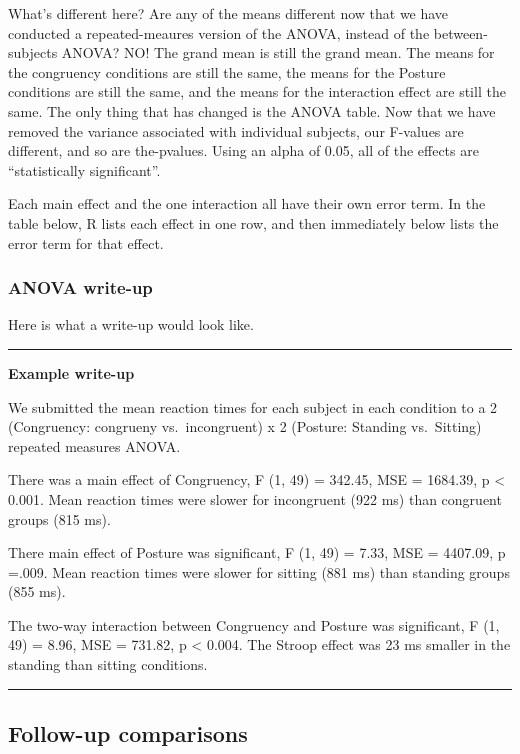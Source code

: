 \documentclass[]{book}
\begin{document}
What's different here? Are any of the means different now that we have
conducted a repeated-meaures version of the ANOVA, instead of the
between-subjects ANOVA? NO! The grand mean is still the grand mean. The
means for the congruency conditions are still the same, the means for
the Posture conditions are still the same, and the means for the
interaction effect are still the same. The only thing that has changed
is the ANOVA table. Now that we have removed the variance associated
with individual subjects, our F-values are different, and so are
the-pvalues. Using an alpha of 0.05, all of the effects are
``statistically significant''.

Each main effect and the one interaction all have their own error term.
In the table below, R lists each effect in one row, and then immediately
below lists the error term for that effect.

\subsubsection{ANOVA write-up}\label{anova-write-up-1}

Here is what a write-up would look like.

\begin{center}\rule{0.5\linewidth}{0.5pt}\end{center}

\textbf{Example write-up}

We submitted the mean reaction times for each subject in each condition
to a 2 (Congruency: congrueny vs.~incongruent) x 2 (Posture: Standing
vs.~Sitting) repeated measures ANOVA.

There was a main effect of Congruency, F (1, 49) = 342.45, MSE =
1684.39, p \textless{} 0.001. Mean reaction times were slower for
incongruent (922 ms) than congruent groups (815 ms).

There main effect of Posture was significant, F (1, 49) = 7.33, MSE =
4407.09, p =.009. Mean reaction times were slower for sitting (881 ms)
than standing groups (855 ms).

The two-way interaction between Congruency and Posture was significant,
F (1, 49) = 8.96, MSE = 731.82, p \textless{} 0.004. The Stroop effect
was 23 ms smaller in the standing than sitting conditions.

\begin{center}\rule{0.5\linewidth}{0.5pt}\end{center}

\subsection{Follow-up comparisons}\label{follow-up-comparisons-1}
\end{document}

